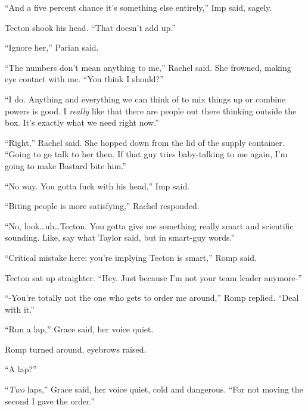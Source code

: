 ``And a five percent chance it's something else entirely,'' Imp said, sagely.



Tecton shook his head.  ``That doesn't add up.''



``Ignore her,'' Parian said.



``The numbers don't mean anything to me,'' Rachel said.  She frowned, making eye contact with me.  ``You think I should?''



``I do.  Anything and everything we can think of to mix things up or combine powers is good.  I \emph{really} like that there are people out there thinking outside the box.  It's exactly what we need right now.''



``Right,'' Rachel said.  She hopped down from the lid of the supply container.  ``Going to go talk to her then.  If that guy tries baby-talking to me again, I'm going to make Bastard bite him.''



``No way.  You gotta fuck with his head,'' Imp said.



``Biting people is more satisfying,'' Rachel responded.



``No, look\ldots uh\ldots Tecton.  You gotta give me something really smart and scientific sounding.  Like, say what Taylor said, but in smart-guy words.''



``Critical mistake here: you're implying Tecton is smart,'' Romp said.



Tecton sat up straighter.  ``Hey.  Just because I'm not your team leader anymore-''



``-You're totally not the one who gets to order me around,'' Romp replied.  ``Deal with it.''



``Run a lap,'' Grace said, her voice quiet.



Romp turned around, eyebrows raised.



``A lap?''



``\emph{Two }laps,'' Grace said, her voice quiet, cold and dangerous.  ``For not moving the second I gave the order.''




